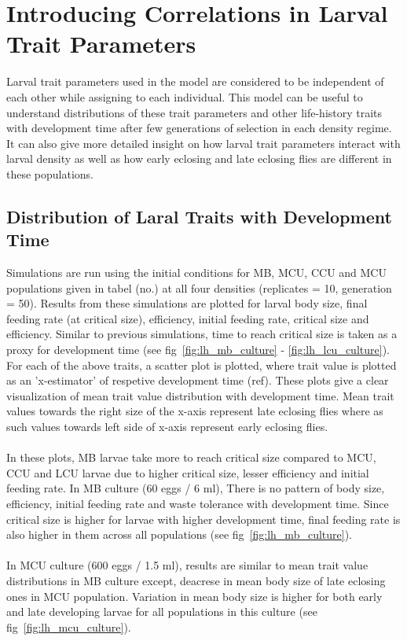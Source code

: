 \chapter{Introducing Correlations in Larval Trait Parameters}
Larval trait parameters used in the model are considered to be independent of each other while assigning to each individual. This model can be useful to understand distributions of these trait parameters and other life-history traits with development time after few generations of selection in each density regime. It can also give more detailed insight on how larval trait parameters interact with larval density as well as how early eclosing and late eclosing flies are different in these populations.
\section{Distribution of Laral Traits with Development Time}
Simulations are run using the initial conditions for MB, MCU, CCU and MCU populations given in tabel (no.) at all four densities (replicates = 10, generation = 50). Results from these simulations are plotted for larval body size, final feeding rate (at critical size), efficiency, initial feeding rate, critical size and efficiency. Similar to previous simulations, time to reach critical size is taken as a proxy for development time (see fig~\ref{fig:lh_mb_culture} - \ref{fig:lh_lcu_culture}). For each of the above traits, a scatter plot is plotted, where trait value is plotted as an 'x-estimator' of respetive development time (ref). These plots give a clear visualization of mean trait value distribution with development time. Mean trait values towards the right size of the x-axis represent late eclosing flies where as such values towards left side of x-axis represent early eclosing flies.\\\\
In these plots, MB larvae take more to reach critical size compared to MCU, CCU and LCU larvae due to higher critical size, lesser efficiency and initial feeding rate. In MB culture (60 eggs / 6 ml), There is no pattern of body size, efficiency, initial feeding rate and waste tolerance with development time. Since critical size is higher for larvae with higher development time, final feeding rate is also higher in them across all populations (see fig~\ref{fig:lh_mb_culture}). \\\\
In MCU culture (600 eggs / 1.5 ml), results are similar to mean trait value distributions in MB culture except, deacrese in mean body size of late eclosing ones in MCU population. Variation in mean body size is higher for both early and late developing larvae for all populations in this culture (see fig~\ref{fig:lh_mcu_culture}). \\\\
